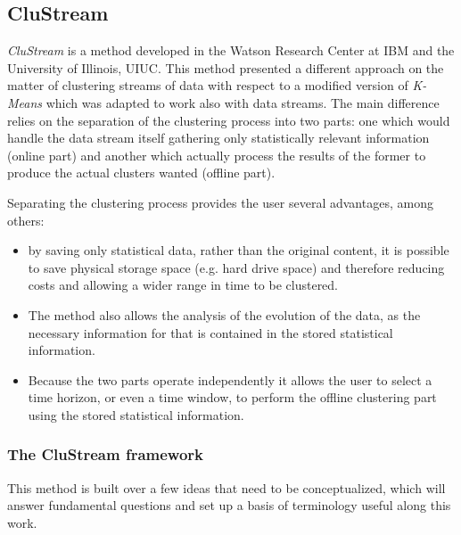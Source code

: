 \subsection{CluStream}

\textit{CluStream} is a method developed in the Watson Research Center at IBM and the University of Illinois, UIUC. This method presented a different approach on the matter of clustering streams of data with respect to a modified version of \textit{K-Means} which was adapted to work also with data streams. The main difference relies on the separation of the clustering process into two parts: one which would handle the data stream itself gathering only statistically relevant information (online part) and another which actually process the results of the former to produce the actual clusters wanted (offline part). 

Separating the clustering process provides the user several advantages, among others:

\begin{itemize}
 \item by saving only statistical data, rather than the original content, it is possible to save physical storage space (e.g. hard drive space) and therefore reducing costs and allowing a wider range in time to be clustered.
 
 \item The method also allows the analysis of the evolution of the data, as the necessary information for that is contained in the stored statistical information.
 
 \item Because the two parts operate independently it allows the user to select a time horizon, or even a time window, to perform the offline clustering part using the stored statistical information.
\end{itemize}

\subsubsection{The CluStream framework}

This method is built over a few ideas that need to be conceptualized, which will answer fundamental questions and set up a basis of terminology useful along this work.


